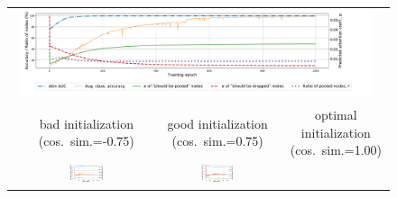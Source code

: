 \begin{figure}[thb]
	\newcommand{\width}{0.28\textwidth}
	\begin{center}
		\begin{small}
			\setlength{\tabcolsep}{3pt}
			\begin{tabular}{cccc}
				\multicolumn{4}{c}{
					\includegraphics[width=0.95\textwidth, trim={1.5cm 1cm 3cm 10.5cm}, clip]{colors_init/legend.pdf}} \\
				& \scriptsize bad initialization (cos.~sim.=-0.75) &\scriptsize
				good initialization (cos.~sim.=0.75) &
				\scriptsize optimal initialization (cos.~sim.=1.00) \\
				\rotatebox[origin=c]{90}{\small \textsc{Unsupervised}} &
				{\includegraphics[width=\width, align=c, trim={0cm 0cm 0.5cm 0cm}, clip]{colors_init/bad_unsup}} & %
				{\includegraphics[width=\width, align=c, trim={0cm 0cm 0.5cm 0cm}, clip]{colors_init/good1_unsup}} &

\end{tabular}
\end{small}
\end{center}
\end{figure}
